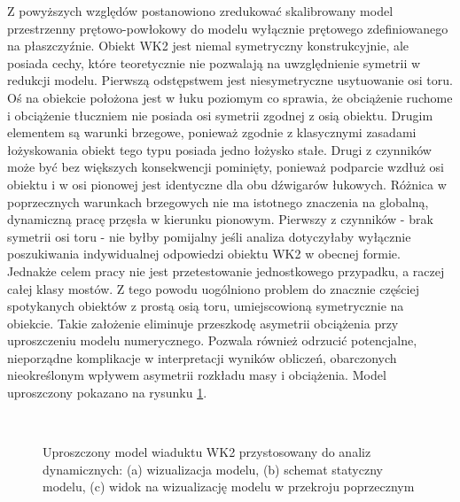 Z powyższych względów postanowiono zredukować skalibrowany model przestrzenny prętowo-powłokowy do modelu wyłącznie prętowego zdefiniowanego na płaszczyźnie. Obiekt WK2 jest niemal symetryczny konstrukcyjnie, ale posiada cechy, które teoretycznie nie pozwalają na uwzględnienie symetrii w redukcji modelu. Pierwszą odstępstwem jest niesymetryczne usytuowanie osi toru. Oś na obiekcie położona jest w łuku poziomym co sprawia, że obciążenie ruchome i obciążenie tłuczniem nie posiada osi symetrii zgodnej z osią obiektu. Drugim elementem są warunki brzegowe, ponieważ zgodnie z klasycznymi zasadami łożyskowania obiekt tego typu posiada jedno łożysko stałe. Drugi z czynników może być bez większych konsekwencji pominięty, ponieważ podparcie wzdłuż osi obiektu i w osi pionowej jest identyczne dla obu dźwigarów łukowych. Różnica w poprzecznych warunkach brzegowych nie ma istotnego znaczenia na globalną, dynamiczną pracę przęsła w kierunku pionowym. Pierwszy z czynników - brak symetrii osi toru - nie byłby pomijalny jeśli analiza dotyczyłaby wyłącznie poszukiwania indywidualnej odpowiedzi obiektu WK2 w obecnej formie. Jednakże celem pracy nie jest przetestowanie jednostkowego przypadku, a raczej całej klasy mostów. Z tego powodu uogólniono problem do znacznie częściej spotykanych obiektów z prostą osią toru, umiejscowioną symetrycznie na obiekcie. Takie założenie eliminuje przeszkodę asymetrii obciążenia przy uproszczeniu modelu numerycznego. Pozwala również odrzucić potencjalne, nieporządne komplikacje w interpretacji wyników obliczeń, obarczonych nieokreślonym wpływem asymetrii rozkładu masy i obciążenia. Model uproszczony pokazano na rysunku \ref{fig:wk2_model_plaski}.

\begin{figure}[hbt!]
	\centering
	\begin{minipage}{0.7\textwidth}
		\\
	\end{minipage}\qquad
	\begin{minipage}{0.15\textwidth}
	\end{minipage}
	\captionsetup{justification=centering}
	\caption{Uproszczony model wiaduktu WK2 przystosowany do analiz dynamicznych: (a) wizualizacja modelu, (b) schemat statyczny modelu, (c) widok na wizualizację modelu w przekroju poprzecznym}
	\label{fig:wk2_model_plaski}
\end{figure}


